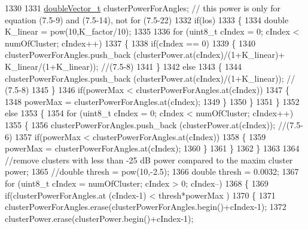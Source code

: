 \begin{DoxyCode}
1330 
1331         \hyperlink{namespacens3_aa6f1edf6566ca6afec613bc6e40240ea}{doubleVector\_t} clusterPowerForAngles; \textcolor{comment}{// this power is only for equation (7.5-9) and
       (7.5-14), not for (7.5-22)}
1332         \textcolor{keywordflow}{if}(los)
1333         \{
1334                 \textcolor{keywordtype}{double} K\_linear = pow(10,K\_factor/10);
1335 
1336                 \textcolor{keywordflow}{for} (uint8\_t cIndex = 0; cIndex < numOfCluster; cIndex++)
1337                 \{
1338                         \textcolor{keywordflow}{if}(cIndex == 0)
1339                         \{
1340                                 clusterPowerForAngles.push\_back (clusterPower.at(cIndex)/(1+K\_linear)+
      K\_linear/(1+K\_linear)); \textcolor{comment}{//(7.5-8)}
1341                         \}
1342                         \textcolor{keywordflow}{else}
1343                         \{
1344                                 clusterPowerForAngles.push\_back (clusterPower.at(cIndex)/(1+K\_linear)); \textcolor{comment}{//
      (7.5-8)}
1345                         \}
1346                         \textcolor{keywordflow}{if}(powerMax < clusterPowerForAngles.at(cIndex))
1347                         \{
1348                                 powerMax = clusterPowerForAngles.at(cIndex);
1349                         \}
1350                 \}
1351         \}
1352         \textcolor{keywordflow}{else}
1353         \{
1354                 \textcolor{keywordflow}{for} (uint8\_t cIndex = 0; cIndex < numOfCluster; cIndex++)
1355                 \{
1356                         clusterPowerForAngles.push\_back (clusterPower.at(cIndex)); \textcolor{comment}{//(7.5-6)}
1357                         \textcolor{keywordflow}{if}(powerMax < clusterPowerForAngles.at(cIndex))
1358                         \{
1359                                 powerMax = clusterPowerForAngles.at(cIndex);
1360                         \}
1361                 \}
1362         \}
1363 
1364         \textcolor{comment}{//remove clusters with less than -25 dB power compared to the maxim cluster power;}
1365         \textcolor{comment}{//double thresh = pow(10,-2.5);}
1366         \textcolor{keywordtype}{double} thresh = 0.0032;
1367         \textcolor{keywordflow}{for} (uint8\_t cIndex = numOfCluster; cIndex > 0; cIndex--)
1368         \{
1369                 \textcolor{keywordflow}{if}(clusterPowerForAngles.at (cIndex-1) < thresh*powerMax )
1370                 \{
1371                         clusterPowerForAngles.erase(clusterPowerForAngles.begin()+cIndex-1);
1372                         clusterPower.erase(clusterPower.begin()+cIndex-1);

\end{DoxyCode}
